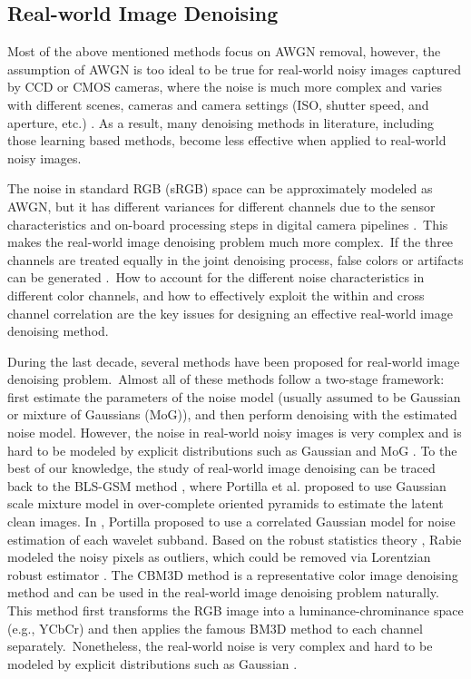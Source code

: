 \subsection{Real-world Image Denoising}
\label{sec:review:feature}

Most of the above mentioned methods focus on AWGN removal, however, the assumption of AWGN is too ideal to be true for real-world noisy images captured by CCD or CMOS cameras, where the noise is much more complex and varies with different scenes, cameras and camera settings (ISO, shutter speed, and aperture, etc.) \cite{crosschannel2016,karaimer_brown_ECCV_2016,dnd2017}. As a result, many denoising methods in literature, including those learning based methods, become less effective when applied to real-world noisy images.

The noise in standard RGB (sRGB) space can be approximately modeled as AWGN, but it has different variances for different channels \cite{Liu2008,Leungtip,crosschannel2016} due to the sensor characteristics and on-board processing steps in digital camera pipelines \cite{crosschannel2016,karaimer_brown_ECCV_2016}.\ This makes the real-world image denoising problem much more complex.\ If the three channels are treated equally in the joint denoising process, false colors or artifacts can be generated \cite{mairal2008sparse}.\ How to account for the different noise characteristics in different color channels, and how to effectively exploit the within and cross channel correlation are the key issues for designing an effective real-world image denoising method.

During the last decade, several methods \cite{blsgsm,fullyblind,huber2011robust,rabie2005robust,cbm3d,Liu2008,noiseclinic,Zhu_2016_CVPR,
crosschannel2016,neatimage} have been proposed for real-world image denoising problem.\ Almost all of these methods follow a two-stage framework: first estimate the parameters of the noise model (usually assumed to be Gaussian or mixture of Gaussians (MoG)), and then perform denoising with the estimated noise model. However, the noise in real-world noisy images is very complex and is hard to be modeled by explicit distributions such as Gaussian and MoG \cite{Liu2008,Leungtip,crosschannel2016,karaimer_brown_ECCV_2016,dnd2017}. To the best of our knowledge, the study of real-world image denoising can be traced back to the BLS-GSM method \cite{blsgsm}, where Portilla et al. proposed to use Gaussian scale mixture model in over-complete oriented pyramids to estimate the latent clean images. In \cite{fullyblind}, Portilla proposed to use a correlated Gaussian model for noise estimation of each wavelet subband. Based on the robust statistics theory \cite{huber2011robust}, Rabie modeled the noisy pixels as outliers, which could be removed via Lorentzian robust estimator \cite{rabie2005robust}. The CBM3D method \cite{cbm3d} is a representative color image denoising method and can be used in the real-world image denoising problem naturally. This method first transforms the RGB image into a luminance-chrominance space (e.g., YCbCr) and then applies the famous BM3D method \cite{bm3d} to each channel separately.\ Nonetheless, the real-world noise is very complex and hard to be modeled by
explicit distributions such as Gaussian \cite{healey1994radiometric}.


